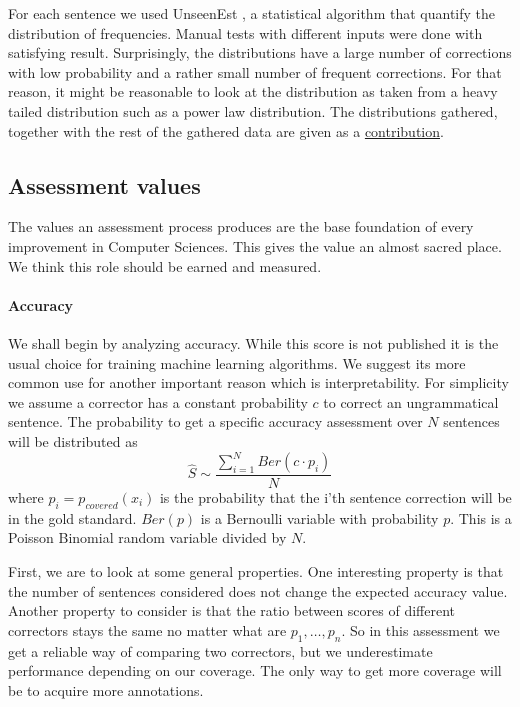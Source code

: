 \documentclass[english]{article}
\begin{document}
For each sentence we used UnseenEst \cite{zou2015quantifying}, a statistical algorithm that quantify the distribution of frequencies. Manual tests with different inputs were done with satisfying result. Surprisingly, the distributions have a large number of corrections with low probability and a rather small number of frequent corrections. For that reason, it might be reasonable to look at the distribution as taken from a heavy tailed distribution such as a power law distribution. The distributions gathered, together with the rest of the gathered data are given as a \href{https://github.com/borgr/assess_learner_language}{contribution}.

\subsection{Assessment values}\label{sec:Assessment-values}

The values an assessment process produces are the base foundation of
 every improvement in Computer Sciences. This gives the value an
  almost sacred place. We think this role should be earned and measured.
 
\paragraph{Accuracy}We shall begin by analyzing accuracy. While this score is not published it is the usual choice for training machine learning algorithms. We suggest its more common use for another important reason which is interpretability.
For simplicity we assume a corrector has a constant probability $c$ to correct an ungrammatical sentence. The probability to get a specific accuracy assessment over $N$ sentences will be distributed as $$\hat{S}\sim\frac{\sum_{i=1}^{N}Ber\left(c\cdot p_i\right)}{N} $$ 
where $p_i=p_{covered}\left(x_i\right) $ is the probability that the i'th sentence correction will be in the gold standard. 
$Ber\left(p\right)$ is a Bernoulli variable with probability $p$. This is a Poisson Binomial random variable divided by $N$. 

First, we are to look at some general properties.
 One interesting property is that the number of sentences considered does not change the expected accuracy value.
 Another property to consider is that the ratio between scores of different correctors stays the same no matter what are $p_1,\ldots,p_n$. So in this assessment we get a reliable way of comparing two correctors, but we underestimate performance depending on our coverage. The only way to get more coverage will be to acquire more annotations.
 
\end{document}
